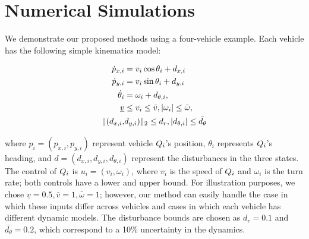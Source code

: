 \section{Numerical Simulations \label{sec:sim}}
We demonstrate our proposed methods using a four-vehicle example. Each vehicle has the following simple kinematics model:

\begin{equation}
\label{eq:dyn_i}
\begin{aligned}
\dot{p}_{x,i} &= v_i \cos \theta_i + d_{x,i} \\
\dot{p}_{y,i} &= v_i \sin \theta_i + d_{y,i}\\
\dot{\theta}_i &= \omega_i + d_{\theta,i}, \\
\underline{v} & \le v_i \le \bar{v}, |\omega_i| \le \bar{\omega},\\
\|(d_{x,i}, & d_{y,i}) \|_2 \le d_{r}, |d_{\theta,i}| \le \bar{d_{\theta}}
\end{aligned}
\end{equation}

\noindent where $p_i = (p_{x,i}, p_{y,i})$ represent vehicle $Q_i$'s position, $\theta_i$ represents $Q_i$'s heading, and $d = (d_{x,i}, d_{y,i}, d_{\theta,i})$ represent the disturbances in the three states. The control of $Q_i$ is $u_i = (v_i, \omega_i)$, where $v_i$ is the speed of $Q_i$ and $\omega_i$ is the turn rate; both controls have a lower and upper bound. For illustration purposes, we chose $\underline{v} = 0.5, \bar{v} = 1, \bar\omega = 1$; however, our method can easily handle the case in which these inputs differ across vehicles and cases in which each vehicle has different dynamic models. The disturbance bounds are chosen as $d_{r} = 0.1$ and $\bar{d_{\theta}} = 0.2$, which correspond to a 10\% uncertainty in the dynamics. %

%


